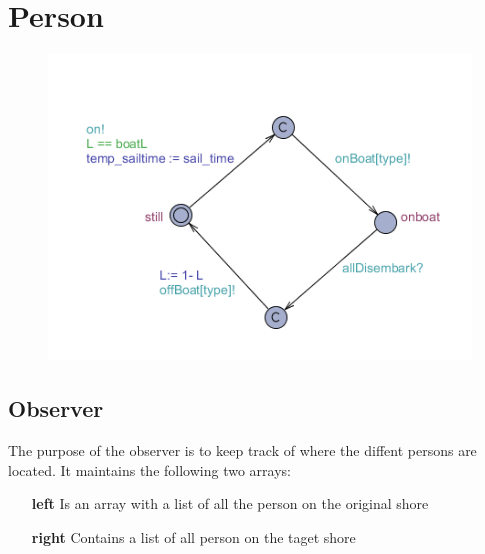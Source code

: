 















\section{Person}
\begin{figure}%
\includegraphics[width=\columnwidth]{pictures/person.png}%
\caption{}%
\label{}%
\end{figure}



















\subsection{Observer}
The purpose of the observer is to keep track of where the diffent persons are located. It maintains the following two arrays:
\begin{itemize}
	\item[\textbf{left}] Is an array with a list of all the person on the original shore
	\item[\textbf{right}] Contains a list of all person on the taget shore
\end{itemize}

